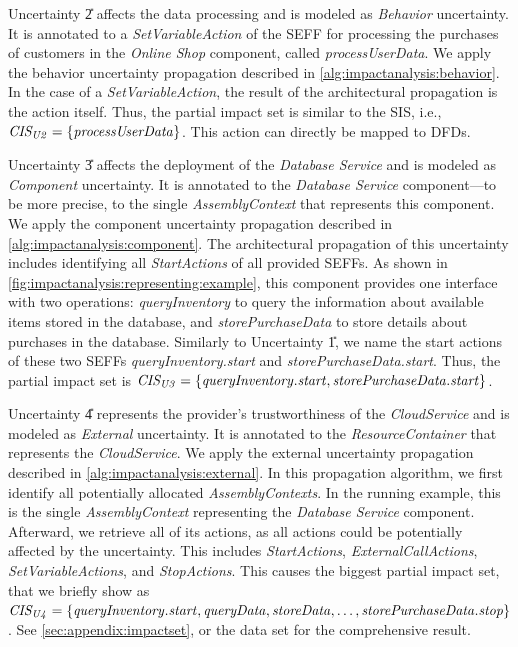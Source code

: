 Uncertainty \U{2} affects the data processing and is modeled as \emph{Behavior} uncertainty.
It is annotated to a \emph{SetVariableAction} of the \ac{SEFF} for processing the purchases of customers in the \emph{Online Shop} component, called \emph{processUserData}.
We apply the behavior uncertainty propagation described in \autoref{alg:impactanalysis:behavior}.
In the case of a \emph{SetVariableAction}, the result of the architectural propagation is the action itself.
Thus, the partial impact set is similar to the \ac{SIS}, i.e., $\mathit{CIS_{U2}} = \{ \mathit{processUserData} \}$.
This action can directly be mapped to \acp{DFD}.

Uncertainty \U{3} affects the deployment of the \emph{Database Service} and is modeled as \emph{Component} uncertainty.
It is annotated to the \emph{Database Service} component---to be more precise, to the single \emph{AssemblyContext} that represents this component.
We apply the component uncertainty propagation described in \autoref{alg:impactanalysis:component}.
The architectural propagation of this uncertainty includes identifying all \emph{StartActions} of all provided \acp{SEFF}.
As shown in \autoref{fig:impactanalysis:representing:example}, this component provides one interface with two operations: \emph{queryInventory} to query the information about available items stored in the database, and \emph{storePurchaseData} to store details about purchases in the database.
Similarly to Uncertainty \U{1}, we name the start actions of these two \acp{SEFF} \emph{queryInventory.start} and \emph{storePurchaseData.start}.
Thus, the partial impact set is $\mathit{CIS_{U3}} = \{ \mathit{queryInventory.start}, \mathit{storePurchaseData.start} \}$.

Uncertainty \U{4} represents the provider's trustworthiness of the \emph{CloudService} and is modeled as \emph{External} uncertainty.
It is annotated to the \emph{ResourceContainer} that represents the \emph{CloudService}.
We apply the external uncertainty propagation described in \autoref{alg:impactanalysis:external}.
In this propagation algorithm, we first identify all potentially allocated \emph{AssemblyContexts}.
In the running example, this is the single \emph{AssemblyContext} representing the \emph{Database Service} component.
Afterward, we retrieve all of its actions, as all actions could be potentially affected by the uncertainty.
This includes \emph{StartActions}, \emph{ExternalCallActions}, \emph{SetVariableActions}, and \emph{StopActions}.
This causes the biggest partial impact set, that we briefly show as $\mathit{CIS_{U4}} = \{ \mathit{queryInventory.start}, \mathit{queryData}, \mathit{storeData}, \dots, \mathit{storePurchaseData.stop} \}$.
See \autoref{sec:appendix:impactset}, or the data set \cite{dataset} for the comprehensive result.


